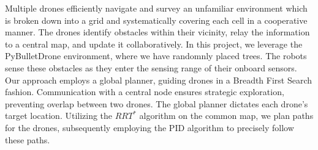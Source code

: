 Multiple drones efficiently navigate and survey an unfamiliar environment which is broken down into a grid and systematically covering each cell in a cooperative manner.
The drones identify obstacles within their vicinity, relay the information to a central map, and update it collaboratively.
In this project, we leverage the PyBulletDrone\cite{panerati2021learning} environment, where we have randomnly placed trees.
The robots sense these obstacles as they enter the sensing range of their onboard sensors.
Our approach employs a global planner, guiding drones in a Breadth First Search fashion.
Communication with a central node ensures strategic exploration, preventing overlap between two drones.
The global planner dictates each drone's target location.
Utilizing the \(RRT^*\) algorithm on the common map, we plan paths for the drones, subsequently employing the PID algorithm to precisely follow these paths.
